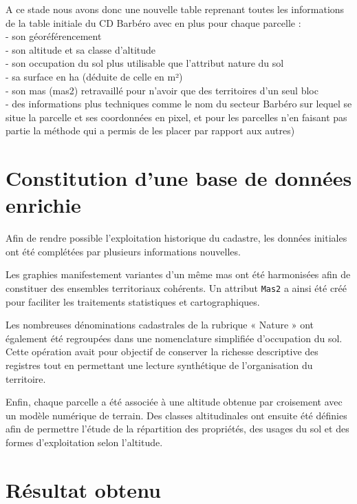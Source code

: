 A ce stade nous avons donc une nouvelle table reprenant toutes les informations de la table initiale du CD Barbéro avec en plus pour chaque parcelle :\\
- son géoréférencement \\
- son altitude et sa classe d'altitude\\
- son occupation du sol plus utilisable que l'attribut nature du sol\\
- sa surface en ha (déduite de celle en m²)\\
- son mas (mas2) retravaillé pour n'avoir que des territoires d'un seul bloc \\
- des informations plus techniques comme le nom du secteur Barbéro sur lequel se situe la parcelle et ses coordonnées en pixel, et pour les parcelles n'en faisant pas partie la méthode qui a permis de les placer par rapport aux autres)



\section{Constitution d'une base de données enrichie}

Afin de rendre possible l'exploitation historique du cadastre, les données initiales ont été complétées par plusieurs informations nouvelles.

Les graphies manifestement variantes d'un même mas ont été harmonisées afin de constituer des ensembles territoriaux cohérents. Un attribut \texttt{Mas2} a ainsi été créé pour faciliter les traitements statistiques et cartographiques.

Les nombreuses dénominations cadastrales de la rubrique « Nature » ont également été regroupées dans une nomenclature simplifiée d'occupation du sol. Cette opération avait pour objectif de conserver la richesse descriptive des registres tout en permettant une lecture synthétique de l'organisation du territoire.

Enfin, chaque parcelle a été associée à une altitude obtenue par croisement avec un modèle numérique de terrain. Des classes altitudinales ont ensuite été définies afin de permettre l'étude de la répartition des propriétés, des usages du sol et des formes d'exploitation selon l'altitude.

\section{Résultat obtenu}

